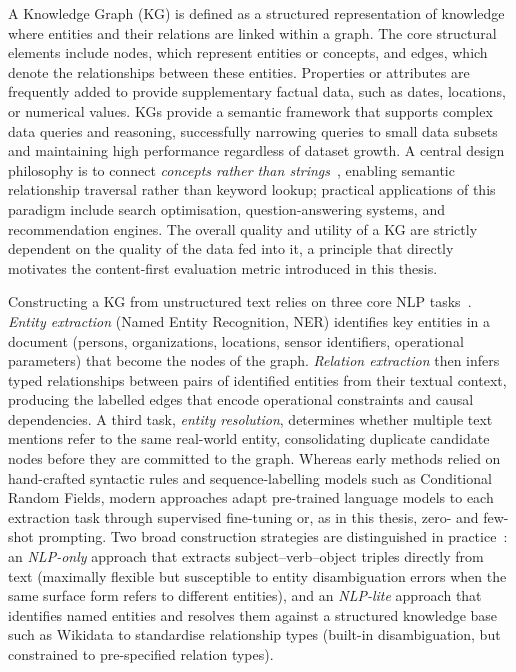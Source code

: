 \documentclass[11pt]{article}
\begin{document}
A Knowledge Graph (KG) is defined as a structured representation of knowledge where entities and their relations are linked within a graph. The core structural elements include nodes, which represent entities or concepts, and edges, which denote the relationships between these entities. Properties or attributes are frequently added to provide supplementary factual data, such as dates, locations, or numerical values. KGs provide a semantic framework that supports complex data queries and reasoning, successfully narrowing queries to small data subsets and maintaining high performance regardless of dataset growth. A central design philosophy is to connect \emph{concepts rather than strings}~\cite{sullivan2021kg}, enabling semantic relationship traversal rather than keyword lookup; practical applications of this paradigm include search optimisation, question-answering systems, and recommendation engines. The overall quality and utility of a KG are strictly dependent on the quality of the data fed into it, a principle that directly motivates the content-first evaluation metric introduced in this thesis.

Constructing a KG from unstructured text relies on three core NLP tasks~\cite{cs520stanford}.
\emph{Entity extraction} (Named Entity Recognition, NER) identifies key entities in a document (persons, organizations, locations, sensor identifiers, operational parameters) that become the nodes of the graph.
\emph{Relation extraction} then infers typed relationships between pairs of identified entities from their textual context, producing the labelled edges that encode operational constraints and causal dependencies.
A third task, \emph{entity resolution}, determines whether multiple text mentions refer to the same real-world entity, consolidating duplicate candidate nodes before they are committed to the graph.
Whereas early methods relied on hand-crafted syntactic rules and sequence-labelling models such as Conditional Random Fields, modern approaches adapt pre-trained language models to each extraction task through supervised fine-tuning or, as in this thesis, zero- and few-shot prompting. Two broad construction strategies are distinguished in practice~\cite{sullivan2021kg}: an \emph{NLP-only} approach that extracts subject--verb--object triples directly from text (maximally flexible but susceptible to entity disambiguation errors when the same surface form refers to different entities), and an \emph{NLP-lite} approach that identifies named entities and resolves them against a structured knowledge base such as Wikidata to standardise relationship types (built-in disambiguation, but constrained to pre-specified relation types).
\end{document}
